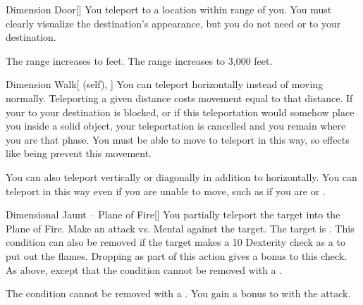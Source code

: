 \lowercase{\hypertarget{spell:Dimension Door}{}}\label{spell:Dimension Door}
\begin{freeability}[Rank 4]{\hypertarget{spell:Dimension Door}{Dimension Door}}[]
You teleport to a location within \rnglong range of you.
You must clearly visualize the destination's appearance, but you do not need  or  to your destination.

\rankline
{} The range increases to \rngext feet.
 The range increases to 3,000 feet.

\end{freeability}
\vspace{0.25em}



\lowercase{\hypertarget{spell:Dimension Walk}{}}\label{spell:Dimension Walk}
\begin{attuneability}[Rank 4]{\hypertarget{spell:Dimension Walk}{Dimension Walk}}[ (self), ]
You can teleport horizontally instead of moving normally.
Teleporting a given distance costs movement equal to that distance.
If your  to your destination is blocked, or if this teleportation would somehow place you inside a solid object, your teleportation is cancelled and you remain where you are that phase.
You must be able to move to teleport in this way, so effects like being  prevent this movement.

\rankline
{} You can also teleport vertically or diagonally in addition to horizontally.
 You can teleport in this way even if you are unable to move, such as if you are  or .

\end{attuneability}
\vspace{0.25em}



\lowercase{\hypertarget{spell:Dimensional Jaunt -- Plane of Fire}{}}\label{spell:Dimensional Jaunt -- Plane of Fire}
\begin{freeability}[Rank 4]{\hypertarget{spell:Dimensional Jaunt -- Plane of Fire}{Dimensional Jaunt -- Plane of Fire}}[]
You partially teleport the target into the Plane of Fire.
Make an attack vs. Mental against the target.
\hit The target is .
This condition can also be removed if the target makes a  10 Dexterity check as a  to put out the flames.
Dropping  as part of this action gives a  bonus to this check.
\crit As above, except that the condition cannot be removed with a .

\rankline
{} The condition cannot be removed with a .
 You gain a  bonus to  with the attack.

\end{freeability}
\vspace{0.25em}




